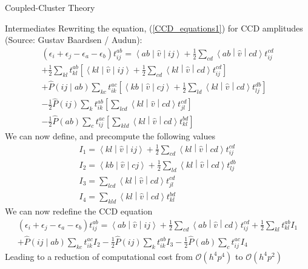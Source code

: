 \documentclass[twoside,english]{uiofysmaster}
\begin{document}
\begin{chapter}{Coupled-Cluster Theory}
\begin{section}{Intermediates}
  		Rewriting the equation, (\ref{CCD_equations1}) for CCD amplitudes (Source: Gustav Baardsen / Audun):
  		\begin{align}
  			(\epsilon_i + \epsilon_j - \epsilon_a - \epsilon_b) t_{ij}^{ab} = \left<ab\middle|\hat v\middle|ij\right> + \frac{1}{2} \sum_{cd}\left<ab\middle|\hat v\middle|cd\right>t_{ij}^{cd} \\
  			+ \frac{1}{2} \sum_{kl} t_{kl}^{ab} \left[ \left<kl\middle|\hat v\middle|ij\right> + \frac{1}{2} \sum_{cd} \left<kl\middle|\hat v\middle|cd\right> t_{ij}^{cd} \right] \\
  			+ \hat P\left(ij\middle|ab\right) \sum_{kc} t_{ik}^{ac} \left[ \left<kb\middle|\hat v\middle|cj\right> + \frac{1}{2}\sum_{ld}\left<kl\middle|\hat v\middle|cd\right>t_{lj}^{db} \right] \\
  			- \frac{1}{2} \hat P(ij) \sum_{k} t_{ik}^{ab} \left[ \sum_{lcd} \left<kl\middle|\hat v\middle|cd\right> t_{jl}^{cd} \right] \\
  			- \frac{1}{2} \hat P(ab) \sum_{c} t_{ij}^{ac} \left[ \sum_{kld} \left<kl\middle|\hat v\middle|cd\right> t_{kl}^{bd} \right]
  		\end{align}
  		We can now define, and precompute the following values
  		\begin{align}
  			I_1 = \left<kl\middle|\hat v\middle|ij\right> + \frac{1}{2} \sum_{cd} \left<kl\middle|\hat v\middle|cd\right> t_{ij}^{cd} \\
  			I_2 = \left<kb\middle|\hat v\middle|cj\right> + \frac{1}{2}\sum_{ld}\left<kl\middle|\hat v\middle|cd\right>t_{lj}^{db} \\
  			I_3 = \sum_{lcd} \left<kl\middle|\hat v\middle|cd\right> t_{jl}^{cd} \\
  			I_4 = \sum_{kld} \left<kl\middle|\hat v\middle|cd\right> t_{kl}^{bd}
  		\end{align}
  		We can now redefine the CCD equation 
  		\begin{align}
  			(\epsilon_i + \epsilon_j - \epsilon_a - \epsilon_b) t_{ij}^{ab} = \left<ab\middle|\hat v\middle|ij\right> + \frac{1}{2} \sum_{cd}\left<ab\middle|\hat v\middle|cd\right>t_{ij}^{cd} + \frac{1}{2} \sum_{kl} t_{kl}^{ab} I_1 \\
  			+ \hat P\left(ij\middle|ab\right) \sum_{kc} t_{ik}^{ac} I_2 - \frac{1}{2} \hat P(ij) \sum_{k} t_{ik}^{ab} I_3  - \frac{1}{2} \hat P(ab) \sum_{c} t_{ij}^{ac} I_4
  		\end{align}
  		Leading to a reduction of computational cost from $\mathcal{O}(h^4 p^4)$ to $\mathcal{O}(h^4 p^2)$


  	\end{section}

\end{chapter}
\end{document}
